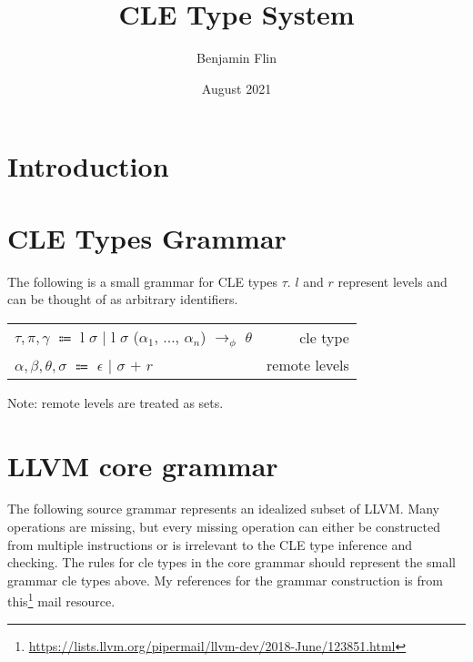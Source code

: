 \documentclass{article}
\title{CLE Type System}
\author{Benjamin Flin}
\date{August 2021}
\begin{document}
\maketitle

\section{Introduction}
\section{CLE Types Grammar}
The following is a small grammar for CLE types $\tau$. 
$l$ and $r$ represent levels and can be thought of as arbitrary identifiers.

\begin{center}
\begin{tabular}{ l r }
    $\tau, \pi, \gamma$ $\Coloneqq$ l $\sigma$ $\bigl\vert$ l $\sigma$ ($\alpha_1$, $\dots$, $\alpha_n$) $\rightarrow_\phi$ $\theta$ & cle type \\
    $\alpha, \beta, \theta, \sigma$ $\Coloneqq$ $\epsilon$ $\bigl\vert$ $\sigma$ $+$ $r$ & remote levels \\
\end{tabular}
\end{center}
Note: remote levels are treated as sets. 

\section{LLVM core grammar}

The following source grammar represents an idealized subset of LLVM. 
Many operations are missing, but every missing operation can either be constructed from multiple instructions or is irrelevant to the CLE type inference and checking. 
The rules for cle types in the core grammar should represent the small grammar cle types above.
My references for the grammar construction is from this\footnote{\url{https://lists.llvm.org/pipermail/llvm-dev/2018-June/123851.html}} mail resource.
\end{document}
